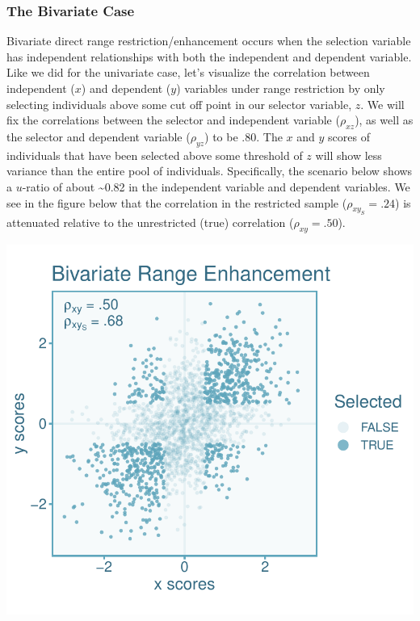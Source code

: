 \documentclass[
  letterpaper,
  DIV=11,
  numbers=noendperiod]{scrreprt}
\begin{document}
\hypertarget{the-bivariate-case-2}{%
\subsubsection*{The Bivariate Case}\label{the-bivariate-case-2}}

Bivariate direct range restriction/enhancement occurs when the selection
variable has independent relationships with both the independent and
dependent variable. Like we did for the univariate case, let's visualize
the correlation between independent (\(x\)) and dependent (\(y\))
variables under range restriction by only selecting individuals above
some cut off point in our selector variable, \(z\). We will fix the
correlations between the selector and independent variable
(\(\rho_{xz}\)), as well as the selector and dependent variable
(\(\rho_{yz}\)) to be .80. The \(x\) and \(y\) scores of individuals
that have been selected above some threshold of \(z\) will show less
variance than the entire pool of individuals. Specifically, the scenario
below shows a \(u\)-ratio of about \textasciitilde0.82 in the
independent variable and dependent variables. We see in the figure below
that the correlation in the restricted sample (\(\rho_{xy_S}=.24\)) is
attenuated relative to the unrestricted (true) correlation
(\(\rho_{xy}=.50\)).

\includegraphics{indirect_range_restriction_files/figure-pdf/unnamed-chunk-5-1.pdf}
\end{document}
